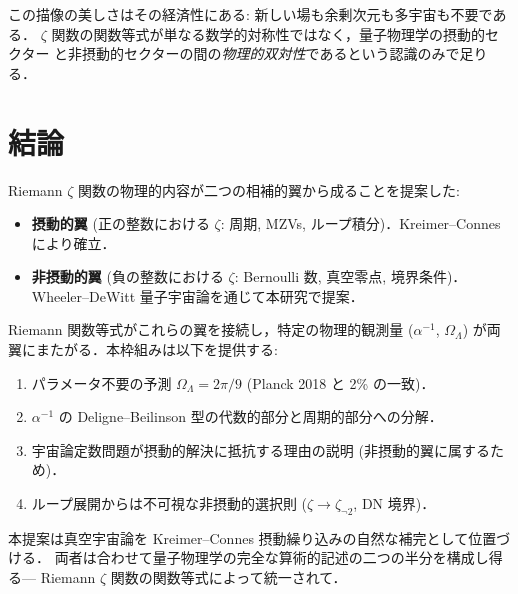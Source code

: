 \documentclass[11pt,a4paper]{article}
\begin{document}
この描像の美しさはその経済性にある: 新しい場も余剰次元も多宇宙も不要である．
$\zeta$ 関数の関数等式が単なる数学的対称性ではなく，量子物理学の摂動的セクター
と非摂動的セクターの間の\emph{物理的双対性}であるという認識のみで足りる．

\section{結論}

Riemann $\zeta$ 関数の物理的内容が二つの相補的翼から成ることを提案した:

\begin{itemize}
\item \textbf{摂動的翼} (正の整数における $\zeta$: 周期, MZVs,
ループ積分)．Kreimer--Connes により確立．
\item \textbf{非摂動的翼} (負の整数における $\zeta$: Bernoulli 数,
真空零点, 境界条件)．Wheeler--DeWitt 量子宇宙論を通じて本研究で提案．
\end{itemize}

Riemann 関数等式がこれらの翼を接続し，特定の物理的観測量 ($\alpha^{-1}$,
$\Omega_\Lambda$) が両翼にまたがる．本枠組みは以下を提供する:
\begin{enumerate}
\item パラメータ不要の予測 $\Omega_\Lambda = 2\pi/9$
(Planck 2018 と 2\% の一致)．
\item $\alpha^{-1}$ の Deligne--Beilinson 型の代数的部分と周期的部分への分解．
\item 宇宙論定数問題が摂動的解決に抵抗する理由の説明 (非摂動的翼に属するため)．
\item ループ展開からは不可視な非摂動的選択則
($\zeta \to \zeta_{\neg 2}$, DN 境界)．
\end{enumerate}

本提案は真空宇宙論を Kreimer--Connes 摂動繰り込みの自然な補完として位置づける．
両者は合わせて量子物理学の完全な算術的記述の二つの半分を構成し得る---
Riemann $\zeta$ 関数の関数等式によって統一されて．
\end{document}
